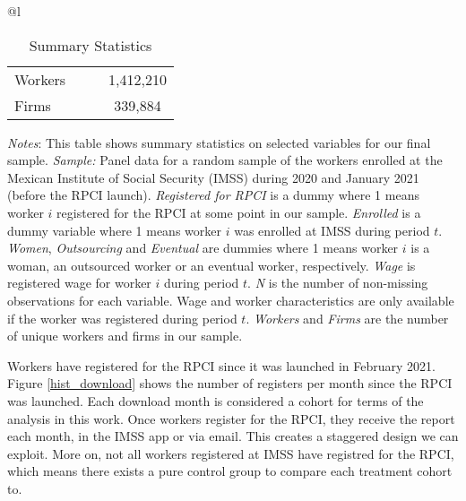 \documentclass[10pt, oneside]{book}
\begin{document}
\begin{table}[H]
\footnotesize
\centering
\begin{threeparttable}
\centering
\caption{Summary Statistics\label{tab:summary_stats_rpci}}

\begin{tabular}[t]{@{}l}
\toprule
\toprule
\begin{tabular}[t]{lccc}

\midrule
Workers & & & 1,412,210\\
Firms & & & 339,884\\
\end{tabular}

\tabularnewline 
\bottomrule
\bottomrule

\end{tabular}

\begin{tablenotes}
\setlength{}
\scriptsize
\item \textit{Notes}: This table shows summary statistics on selected variables for our final sample. \textit{Sample:} Panel data for a random sample of the workers enrolled at the Mexican Institute of Social Security (IMSS) during 2020 and January 2021 (before the RPCI launch). \textit{Registered for RPCI} is a dummy where 1 means worker $i$ registered for the RPCI at some point in our sample. \textit{Enrolled} is a dummy variable where 1 means worker $i$ was enrolled at IMSS during period $t$. \textit{Women}, \textit{Outsourcing} and \textit{Eventual} are dummies where 1 means worker $i$ is a woman, an outsourced worker or an eventual worker, respectively. \textit{Wage} is registered wage for worker $i$ during period $t$. \textit{N} is the number of non-missing observations for each variable. Wage and worker characteristics are only available if the worker was registered during period $t$. \textit{Workers} and \textit{Firms} are the number of unique workers and firms in our sample. %
\end{tablenotes}
\end{threeparttable}
\end{table}


Workers have registered for the RPCI since it was launched in February 2021. Figure \ref{hist_download} shows the number of registers per month since the RPCI was launched. Each download month is considered a cohort for terms of the analysis in this work. Once workers register for the RPCI, they receive the report each month, in the IMSS app or via email. This creates a staggered design we can exploit. More on, not all workers registered at IMSS have registred for the RPCI, which means there exists a pure control group to compare each treatment cohort to.  \\
\end{document}
